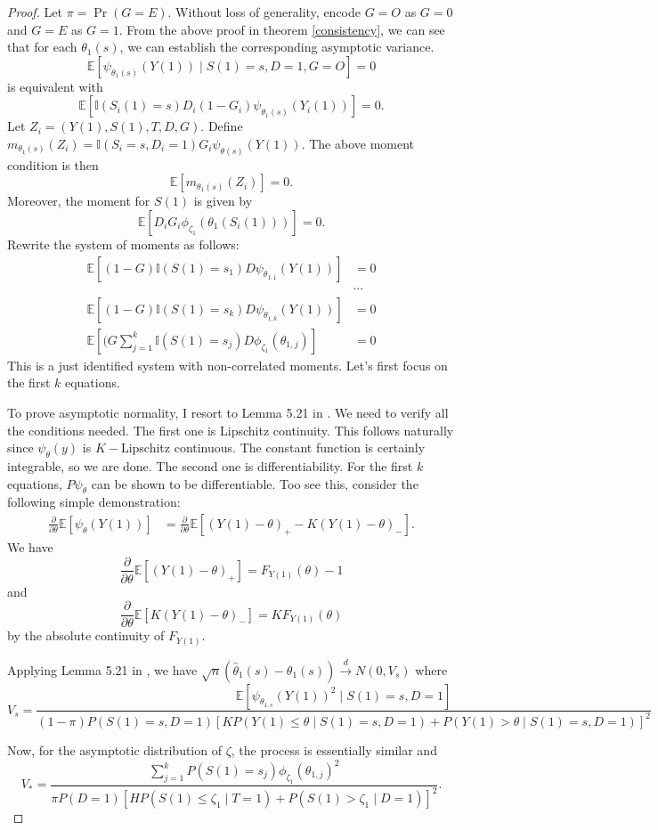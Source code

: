 \documentclass[12pt]{article}
\newcommand{\Indc}{\mathbb{I}}
\newcommand{\Ep}{\mathbb{E}}
\begin{document}
	\begin{proof}
		Let $\pi = \Pr(G = E).$ Without loss of generality, encode $G = O$ as $G = 0$ and $G = E$ as $G = 1$. From the above proof in theorem \ref{consistency}, we can see that for each $\theta_1(s)$, we can establish the corresponding asymptotic variance.
		$$\Ep[\psi_{\theta_1(s)}(Y(1)) \mid S(1) = s, D = 1, G = O] = 0$$ is equivalent with 
		$$\Ep[\Indc(S_i(1) = s) D_i(1-G_i)\psi_{\theta_1(s)}(Y_i(1))] = 0.$$
		Let $Z_i = (Y(1), S(1), T, D, G)$. Define $m_{\theta_1(s)}(Z_i) = \Indc(S_i = s, D_i=1) G_i \psi_{\theta(s)}(Y(1)).$ The above moment condition is then $$\Ep[m_{\theta_1(s)}(Z_i)] = 0.$$ 
		Moreover, the moment for $S(1)$ is given by 
		$$\mathbb{E}\left[ D_i G_i \phi_{\zeta_1}(\theta_1(S_i(1)))\right] = 0.$$
		Rewrite the system of moments as follows:
		\begin{align*}
		\Ep[(1-G)\Indc(S(1) = s_1) D \psi_{\theta_{1,1}}(Y(1))] & = 0\\
		& \cdots \\
		\Ep[(1-G)\Indc(S(1) = s_k) D \psi_{\theta_{1,k}}(Y(1))] & = 0\\
		\Ep[(G \sum_{j =1}^k \Indc(S(1) = s_j) D \phi_{\zeta_1}(\theta_{1,j})] & = 0
		\end{align*}
		This is a just identified system with non-correlated moments.
		Let's first focus on the first $k$ equations.
		
		To prove asymptotic normality, I resort to Lemma 5.21 in \textcite{van2000asymptotic}. We need to verify all the conditions needed. The first one is Lipschitz continuity. This follows naturally since $\psi_{\theta}(y)$ is $K-$Lipschitz continuous. The constant function is certainly integrable, so we are done. The second one is differentiability. For the first $k$ equations, $P\psi_{\theta}$ can be shown to be differentiable. Too see this, consider the following simple demonstration: 
		\begin{align*}
		\frac{\partial}{\partial \theta}\Ep[\psi_{\theta}(Y(1))] & = \frac{\partial}{\partial \theta} \Ep[(Y(1) - \theta)_+ - K (Y(1) - \theta)_-].
		\end{align*}
		We have
		$$\frac{\partial}{\partial \theta} \Ep[(Y(1) - \theta)_+] = F_{Y(1)}(\theta) - 1$$
		and 
		$$\frac{\partial}{\partial \theta} \Ep[K(Y(1) - \theta)_-] = K F_{Y(1)}(\theta) $$
		by the absolute continuity of $F_{Y(1)}$.
		
		Applying Lemma 5.21 in \textcite{van2000asymptotic}, we have $\sqrt{n} (\hat{\theta}_1(s) - \theta_1(s)) \overset{d}{\to} N(0, V_s)$ where 
		$$V_s = \frac{\Ep[\psi_{\theta_{1,s}}(Y(1))^2 \mid S(1) = s, D = 1]}{(1-\pi) P(S(1)=s, D=1) [K P(Y(1) \leq \theta \mid S(1) = s, D = 1) + P(Y(1) > \theta \mid S(1) = s, D = 1)]^2}$$
		
		Now, for the asymptotic distribution of $\zeta$, the process is essentially similar and $$V_* = \frac{\sum_{j=1}^k P(S(1) = s_j)\phi_{\zeta_1}(\theta_{1,j})^2}{\pi P(D = 1)[H P(S(1) \leq \zeta_1 \mid T = 1) + P(S(1)  > \zeta_1 \mid D = 1)]^2}.$$
	\end{proof}
	
\end{document}
